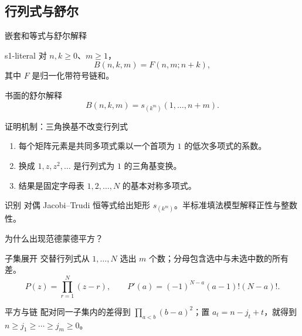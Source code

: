 \documentclass{beamer}
\begin{document}
\subsection{行列式与舒尔}
\begin{frame}{嵌套和等式与舒尔解释}
  \begin{bookresult}{s1-literal}
    对 $n,k\ge0$、$m\ge1$，
    \[ B(n,k,m)=F(n,m;n+k), \]
    其中 $F$ 是归一化带符号链和。
  \end{bookresult}
  \begin{block}{书面的舒尔解释}
    \[ B(n,k,m)=s_{(k^m)}(1,\ldots,n+m). \]
  \end{block}
\end{frame}
\begin{frame}{证明机制：三角换基不改变行列式}
  \begin{enumerate}
    \item 每个矩阵元素是共同多项式乘以一个首项为 $1$ 的低次多项式的系数。
    \item 换成 $1,z,z^2,\ldots$ 是行列式为 $1$ 的三角基变换。
    \item 结果是固定字母表 $1,2,\ldots,N$ 的基本对称多项式。
  \end{enumerate}
  \begin{block}{识别}
    对偶 Jacobi--Trudi 恒等式给出矩形 $s_{(k^m)}$。半标准填法模型解释正性与整数性。
  \end{block}
\end{frame}
\begin{frame}{为什么出现范德蒙德平方？}
  \begin{block}{子集展开}
    交替行列式从 $1,\ldots,N$ 选出 $m$ 个数；分母包含选中与未选中数的所有差。
    \[
      P(z)=\prod_{r=1}^{N}(z-r),\qquad P'(a)=(-1)^{N-a}(a-1)!(N-a)!.
    \]
  \end{block}
  \begin{block}{平方与链}
    配对同一子集内的差得到 $\prod_{a<b}(b-a)^2$；置
    $a_t=n-j_t+t$，就得到 $n\ge j_1\ge\cdots\ge j_m\ge0$。
  \end{block}
\end{frame}
\end{document}
